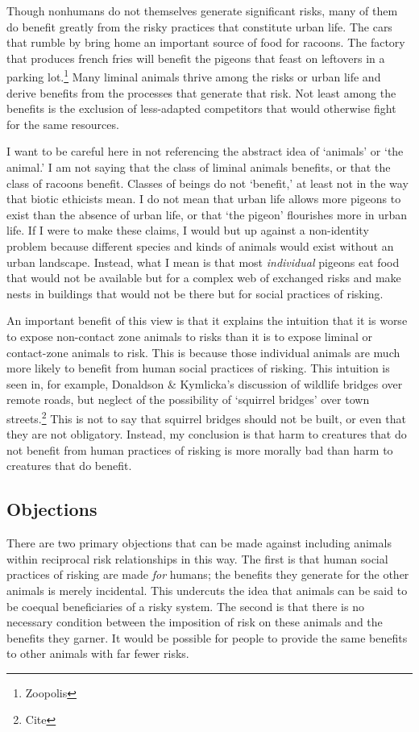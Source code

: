 \documentclass[12pt]{article}
\begin{document}
Though nonhumans do not themselves generate significant risks, many of them do
benefit greatly from the risky practices that constitute urban life. The cars
that rumble by bring home an important source of food for racoons. The factory
that produces french fries will benefit the pigeons that feast on leftovers in
a parking lot.\footnote{Zoopolis} Many liminal animals thrive among the risks
or urban life and derive benefits from the processes that generate that risk.
Not least among the benefits is the exclusion of less-adapted competitors that
would otherwise fight for the same resources.

I want to be careful here in not referencing the abstract idea of ‘animals’ or
‘the animal.’ I am not saying that the class of liminal animals benefits, or
that the class of racoons benefit. Classes of beings do not ‘benefit,’ at least
not in the way that biotic ethicists mean. I do not mean that urban life allows
more pigeons to exist than the absence of urban life, or that ‘the pigeon’
flourishes more in urban life. If I were to make these claims, I would but up
against a non-identity problem because different species and kinds of animals
would exist without an urban landscape. Instead, what I mean is that most
\emph{individual} pigeons eat food that would not be available but for a complex
web of exchanged risks and make nests in buildings that would not be there but
for social practices of risking.

An important benefit of this view is that it explains the intuition that it is
worse to expose non-contact zone animals to risks than it is to expose liminal
or contact-zone animals to risk. This is because those individual animals are
much more likely to benefit from human social practices of risking. This
intuition is seen in, for example, Donaldson \& Kymlicka’s discussion of
wildlife bridges over remote roads, but neglect of the possibility of ‘squirrel
bridges’ over town streets.\footnote{Cite} This is not to say that squirrel
bridges should not be built, or even that they are not obligatory. Instead, my
conclusion is that harm to creatures that do not benefit from human practices
of risking is more morally bad than harm to creatures that do benefit.

\subsection{Objections}

There are two primary objections that can be made against including animals
within reciprocal risk relationships in this way. The first is that human
social practices of risking are made \emph{for} humans; the benefits they
generate for the other animals is merely incidental. This undercuts the idea
that animals can be said to be coequal beneficiaries of a risky system.
The second is that there is no necessary condition between the imposition of
risk on these animals and the benefits they garner. It would be possible for
people to provide the same benefits to other animals with far fewer risks.
\end{document}
